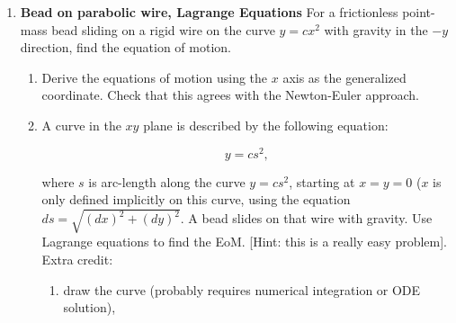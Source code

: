 \documentclass[11pt]{article}
\def\tight{ \setlength{\itemsep}{1.5pt}\setlength{\parskip}{0pt}\setlength{\parsep}{0pt}}
\begin{document}
\begin{enumerate}
\begin{enumerate}
\begin{enumerate}
\item Check that your governing equations reduce to the lecture (ideal, no friction) equations when the friction is zero.
\item Check special cases of the  numerical solutions with solutions you know other ways.  A challenge is to think of as many of these as you can (even if you don't check all of them).   That is, for some special parameter values and/or initial
conditions you know features of the solution (examples: 
\begin{enumerate}
\item No friction means energy is conserved;
\item With friction and no initial rotation  slowing is with constant acceleration, 
\item \etc  
\end{enumerate}


\end{enumerate}

\end{enumerate}

\item {\bf Bead on parabolic wire, Lagrange Equations }\label{HWbeadonwire}
For a frictionless point-mass bead sliding on a rigid wire on the curve
$y=cx^2$ with gravity in the $-y$ direction, find the equation of motion. 

\begin{enumerate}\tight

\item Derive the equations of motion using  the $x$ axis as the generalized
coordinate.  Check that this agrees with the Newton-Euler approach.

\item A curve in the $xy$ plane is described by the following equation:

\[
y = cs^2,
\]

where $s$ is arc-length along the curve $y = cs^2$, starting at $x=y=0$ 
($x$ is only defined implicitly on this curve, using the equation $ds = \sqrt{(dx)^2 + (dy)^2}$.  A bead slides
on that wire with gravity.  Use Lagrange equations to find the EoM. [Hint: this
is a really easy problem]. \\  Extra credit:

\begin{enumerate}[\bf i)]

\item  draw the curve (probably requires 
numerical integration or ODE solution),


\end{enumerate}
\end{enumerate}
\end{enumerate}
\end{document}
